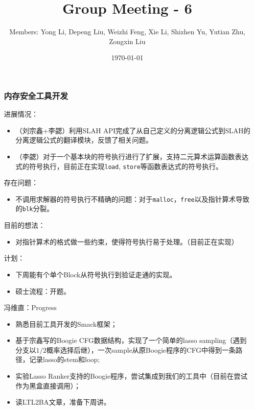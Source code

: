 \documentclass[aspectratio=1610, 13pt]{beamer}
\title{Group Meeting - 6}
\date{\today}
\author{Members: Yong Li, Depeng Liu, Weizhi Feng, Xie Li, Shizhen Yu, Yutian Zhu, Zongxin Liu}
\begin{document}
\maketitle
\begin{frame}\frametitle{内存安全工具开发}

进展情况：
\begin{itemize}
\item （刘宗鑫+李勰）利用SLAH API完成了从自己定义的分离逻辑公式到SLAH的分离逻辑公式的翻译模块，反馈了相关问题。
\item （李勰）对于一个基本块的符号执行进行了扩展，支持二元算术运算函数表达式的符号执行，目前正在实现\texttt{load}, \texttt{store}等函数表达式的符号执行。
\end{itemize}

存在问题：
\begin{itemize}
\item 不调用求解器的符号执行不精确的问题：对于\texttt{malloc}，\texttt{free}以及指针算术导致的\texttt{blk}分裂。


\end{itemize}

目前的想法：
\begin{itemize}
\item 对指针算术的格式做一些约束，使得符号执行易于处理。（目前正在实现）
\end{itemize}

计划：
\begin{itemize}
\item 下周能有个单个Block从符号执行到验证走通的实现。
\item 硕士流程：开题。
\end{itemize}

\end{frame}

\begin{frame}{冯维直：Progress}
    \begin{itemize}
        \item 熟悉目前工具开发的Smack框架；
        \item 基于宗鑫写的Boogie CFG数据结构，实现了一个简单的lasso sampling（遇到分支以$1/2$概率选择后继），一次sample从原Boogie程序的CFG中得到一条路径，记录lasso的stem和loop;
          \item 实验Lasso
        Ranker支持的Boogie程序，尝试集成到我们的工具中（目前在尝试作为黑盒直接调用）；
        \item 读LTL2BA文章，准备下周讲。
\end{itemize}    
\end{frame}
\end{document}
